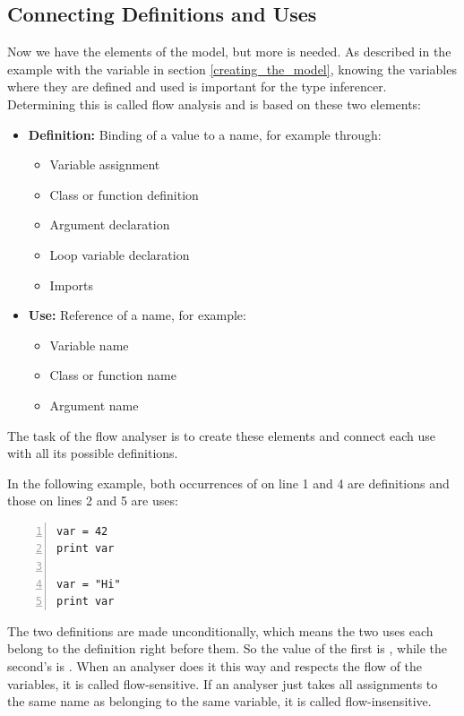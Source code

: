 \documentclass[12pt,halfparskip,DIV11,BCOR10mm]{scrreprt}
\begin{document}
\subsection{Connecting Definitions and Uses}

Now we have the elements of the model, but more is needed. As described in the example with the  variable in section \vref{creating_the_model}, knowing the variables where they are defined and used is important for the type inferencer. Determining this is called flow analysis and is based on these two elements:

\begin{itemize}
	\item \textbf{Definition:} Binding of a value to a name, for example through:
	\begin{itemize}
		\item Variable assignment
		\item Class or function definition
		\item Argument declaration
		\item Loop variable declaration
		\item Imports
	\end{itemize}
	\item \textbf{Use:} Reference of a name, for example:
	\begin{itemize}
		\item Variable name
		\item Class or function name
		\item Argument name
	\end{itemize}
\end{itemize}

The task of the flow analyser is to create these elements and connect each use with all its possible definitions.

In the following example, both occurrences of  on line 1 and 4 are definitions and those on lines 2 and 5 are uses:

\begin{lstlisting}[numbers=left]
var = 42
print var

var = "Hi"
print var
\end{lstlisting}

The two definitions are made unconditionally, which means the two uses each belong to the definition right before them. So the value of the first  is , while the second's is . When an analyser does it this way and respects the flow of the variables, it is called flow-sensitive. If an analyser just takes all assignments to the same name as belonging to the same variable, it is called flow-insensitive.
\end{document}

